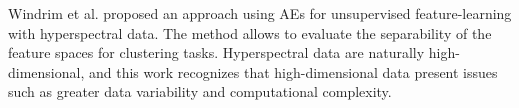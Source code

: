 \documentclass[journal,article,submit,pdftex,moreauthors]{Definitions/mdpi}
\begin{document}
Windrim et al. \cite{Windrim2019} proposed an approach using AEs for unsupervised feature-learning with hyperspectral data. The method allows to evaluate the separability of the feature spaces for clustering tasks. Hyperspectral data are naturally high-dimensional, and this work recognizes that high-dimensional data present issues such as greater data variability and computational complexity. 

\end{document}
